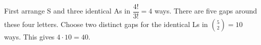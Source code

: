 First arrange S and three identical As in $\dfrac{4!}{3!}=4$ ways. There are five gaps around these four letters. Choose two distinct gaps for the identical Ls in $\binom52=10$ ways. This gives $\boxed{4\cdot10=40}$.
